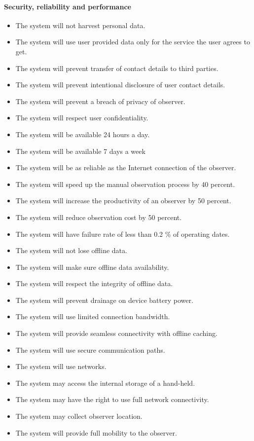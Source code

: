     \paragraph{Security, reliability and performance}
	\begin{itemize}
		\item The system will not harvest personal data.
        \item The system will use user provided data only for the service the user agrees to get.
        \item The system will prevent transfer of contact details to third parties.
        \item The system will prevent intentional disclosure of user contact details.
        \item The system will prevent a breach of privacy of observer.
        \item The system will respect user confidentiality.
        \item The system will be available 24 hours a day.
        \item The system will be available 7 days a week
        \item The system will be as reliable as the Internet connection of the observer.
        \item The system will speed up the manual observation process by 40 percent.
        \item The system will increase the productivity of an observer by 50 percent.
        \item The system will reduce observation cost by 50 percent.
        \item The system will have failure rate of less than 0.2 \% of operating dates. 
        \item The system will not lose offline data.
        \item The system will make sure offline data availability.
        \item The system will respect the integrity of offline data.
        \item The system will prevent drainage on device battery power.
        \item The system will use limited connection bandwidth.
        \item The system will provide seamless connectivity with offline caching.
        \item The system will use secure communication paths.
        \item The system will use networks.
        \item The system may access the internal storage of a hand-held.
        \item The system may have the right to use full network connectivity.
        \item The system may collect observer location.
        \item The system will provide full mobility to the observer.

	\end{itemize}
